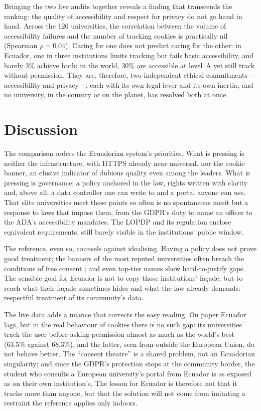 \documentclass[pdflatex,sn-basic,Numbered]{sn-jnl}
\theoremstyle{thmstyleone}
\theoremstyle{thmstyletwo}
\theoremstyle{thmstylethree}
\begin{document}
Bringing the two live audits together reveals a finding that transcends the ranking: the quality of accessibility and respect for privacy do not go hand in hand. Across the 126 universities, the correlation between the volume of accessibility failures and the number of tracking cookies is practically nil (Spearman $\rho=0.04$). Caring for one does not predict caring for the other: in Ecuador, one in three institutions limits tracking but fails basic accessibility, and barely 3\% achieve both; in the world, 30\% are accessible at level~A yet still track without permission. They are, therefore, two independent ethical commitments ---accessibility and privacy---, each with its own legal lever and its own inertia, and no university, in the country or on the planet, has resolved both at once.

\section{Discussion}\label{sec:discusion}
The comparison orders the Ecuadorian system's priorities. What is pressing is neither the infrastructure, with HTTPS already near-universal, nor the cookie banner, an elusive indicator of dubious quality even among the leaders. What is pressing is governance: a policy anchored in the law, rights written with clarity and, above all, a data controller one can write to and a portal anyone can use. That elite universities meet these points so often is no spontaneous merit but a response to laws that impose them, from the GDPR's duty to name an officer to the ADA's accessibility mandates. The LOPDP and its regulation enclose equivalent requirements, still barely visible in the institutions' public window.

The reference, even so, counsels against idealising. Having a policy does not prove good treatment; the banners of the most reputed universities often breach the conditions of free consent \citep{nouwens2020dark,gray2021dark}; and even top-tier names show hard-to-justify gaps. The sensible goal for Ecuador is not to copy those institutions' façade, but to reach what their façade sometimes hides and what the law already demands: respectful treatment of its community's data.

The live data adds a nuance that corrects the easy reading. On paper Ecuador lags, but in the real behaviour of cookies there is no such gap: its universities track the user before asking permission almost as much as the world's best (63.5\% against 68.3\%), and the latter, seen from outside the European Union, do not behave better. The ``consent theatre'' is a shared problem, not an Ecuadorian singularity; and since the GDPR's protection stops at the community border, the student who consults a European university's portal from Ecuador is as exposed as on their own institution's. The lesson for Ecuador is therefore not that it tracks more than anyone, but that the solution will not come from imitating a restraint the reference applies only indoors.
\end{document}

